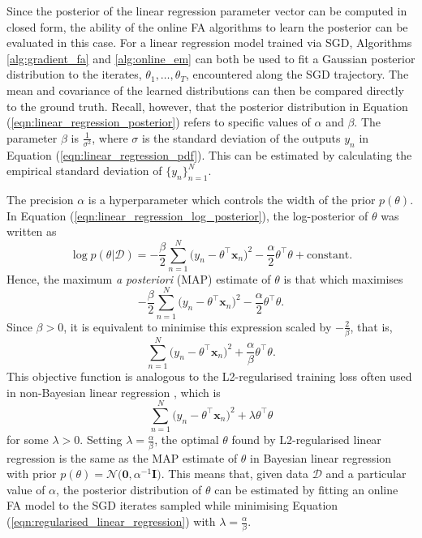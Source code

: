 \documentclass[msc,deptreport.inf]{infthesis} %
\newcommand{\matr}[1]{\mathbf{#1}}
\begin{document}
Since the posterior of the linear regression parameter vector can be computed in closed form, the ability of the online FA algorithms to learn the posterior can be evaluated in this case. For a linear regression model trained via SGD, Algorithms \ref{alg:gradient_fa} and \ref{alg:online_em} can both be used to fit a Gaussian posterior distribution to the iterates, $\theta_1, \dots, \theta_T$, encountered along the SGD trajectory. The mean and covariance of the learned distributions can then be compared directly to the ground truth. Recall, however, that the posterior distribution in Equation (\ref{eqn:linear_regression_posterior}) refers to specific values of $\alpha$ and $\beta$. The parameter $\beta$ is $\frac{1}{\sigma^2}$, where $\sigma$ is the standard deviation of the outputs $y_n$ in Equation (\ref{eqn:linear_regression_pdf}). This can be estimated by calculating the empirical standard deviation of $\{y_n\}_{n=1}^{N}$. 

The precision $\alpha$ is a hyperparameter which controls the width of the prior $p(\theta)$. In Equation (\ref{eqn:linear_regression_log_posterior}), the log-posterior of $\theta$ was written as 
\begin{equation}
	\log p(\theta | \mathcal{D}) 
	= -\frac{\beta}{2} \sum_{n=1}^N \big(y_n - \theta^\intercal \matr{x}_n \big)^2 
	-\frac{\alpha}{2} \theta^\intercal \theta 
	+ \text{constant}.
\end{equation}
Hence, the maximum \emph{a posteriori} (MAP) estimate of $\theta$ is that which maximises
\begin{equation}
	-\frac{\beta}{2} \sum_{n=1}^N \big(y_n - \theta^\intercal \matr{x}_n \big)^2 
	-\frac{\alpha}{2} \theta^\intercal \theta.
\end{equation}
Since $\beta > 0$, it is equivalent to minimise this expression scaled by $-\frac{2}{\beta}$, that is,
\begin{equation}
	\sum_{n=1}^N \big(y_n - \theta^\intercal \matr{x}_n \big)^2 
	+ \frac{\alpha}{\beta} \theta^\intercal \theta.
\end{equation}
This objective function is analogous to the L2-regularised training loss often used in non-Bayesian linear regression \cite{barber2007}, which is 
\begin{equation}\label{eqn:regularised_linear_regression}
	\sum_{n=1}^N \big(y_n - \theta^\intercal \matr{x}_n \big)^2 
	+ \lambda \theta^\intercal \theta 
\end{equation}
for some $\lambda > 0$. Setting $\lambda = \frac{\alpha}{\beta}$, the optimal $\theta$ found by L2-regularised linear regression is the same as the MAP estimate of $\theta$ in Bayesian linear regression with prior $p(\theta) = \mathcal{N}\big(\matr{0}, \alpha^{-1} \matr{I} \big)$. This means that, given data $\mathcal{D}$ and a particular value of $\alpha$, the posterior distribution of $\theta$ can be estimated by fitting an online FA model to the SGD iterates sampled while minimising Equation (\ref{eqn:regularised_linear_regression}) with $\lambda = \frac{\alpha}{\beta}$.
 
\end{document}
